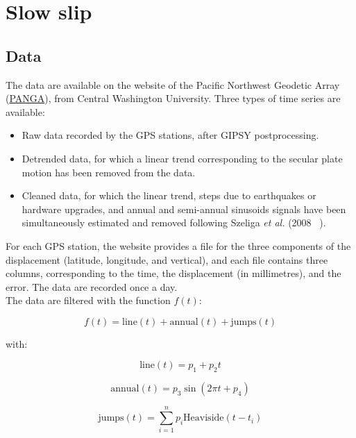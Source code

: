 \documentclass[main.tex]{subfiles}
\begin{document}
\part{Slow slip}

\chapter{Data}

The data are available on the website of the Pacific Northwest Geodetic Array (\href{http://www.geodesy.cwu.edu/}{PANGA}), from Central Washington University. Three types of time series are available:

\begin{itemize}
\item Raw data recorded by the GPS stations, after GIPSY postprocessing.
\item Detrended data, for which a linear trend corresponding to the secular plate motion has been removed from the data.
\item Cleaned data, for which the linear trend, steps due to earthquakes or hardware upgrades, and annual and semi-annual sinusoids signals have been simultaneously estimated and removed following Szeliga \textit{et al.} (2008 ~\cite{SZE_2008}).
\end{itemize}

For each GPS station, the website provides a file for the three components of the displacement (latitude, longitude, and vertical), and each file contains three columns, corresponding to the time, the displacement (in millimetres), and the error. The data are recorded once a day. \\

The data are filtered with the function $f (t)$:

\begin{equation}
f (t) = \textrm{line} (t) + \textrm{annual} (t) + \textrm{jumps} (t)
\end{equation}

with:

\begin{equation}
\textrm{line} (t) = p_1 + p_2 t
\end{equation}

\begin{equation}
\textrm{annual} (t) = p_3 \sin (2 \pi t + p_4)
\end{equation}

\begin{equation}
\textrm{jumps} (t) = \sum_{i = 1}^{n} p_i \textrm{Heaviside} (t - t_i)
\end{equation}
\end{document}
